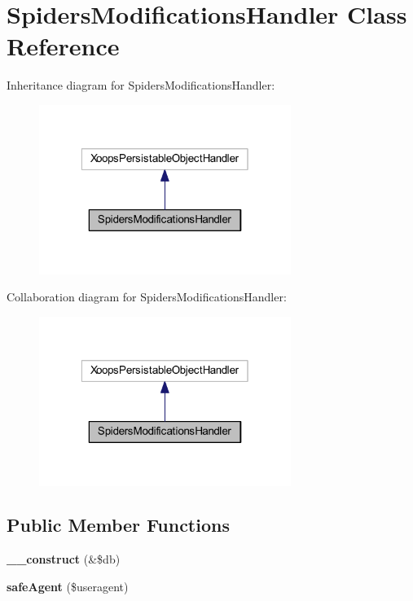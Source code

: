 \hypertarget{class_spiders_modifications_handler}{\section{Spiders\-Modifications\-Handler Class Reference}
\label{class_spiders_modifications_handler}
}


Inheritance diagram for Spiders\-Modifications\-Handler\-:
\nopagebreak
\begin{figure}[H]
\begin{center}
\leavevmode
\includegraphics[width=232pt]{class_spiders_modifications_handler__inherit__graph}
\end{center}
\end{figure}


Collaboration diagram for Spiders\-Modifications\-Handler\-:
\nopagebreak
\begin{figure}[H]
\begin{center}
\leavevmode
\includegraphics[width=232pt]{class_spiders_modifications_handler__coll__graph}
\end{center}
\end{figure}
\subsection*{Public Member Functions}
\begin{DoxyCompactItemize}
\item 
\hypertarget{class_spiders_modifications_handler_aaf2ef772755ec6f361d44e16cc9ffd69}{{\bfseries \-\_\-\-\_\-construct} (\&\$db)}\label{class_spiders_modifications_handler_aaf2ef772755ec6f361d44e16cc9ffd69}

\item 
\hypertarget{class_spiders_modifications_handler_a8d10e56d5b0ef0ef60b3c084826f2362}{{\bfseries safe\-Agent} (\$useragent)}\label{class_spiders_modifications_handler_a8d10e56d5b0ef0ef60b3c084826f2362}

\end{DoxyCompactItemize}


